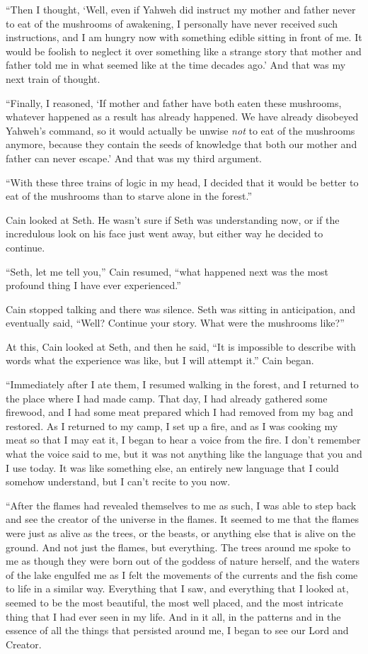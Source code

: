 \documentclass[12pt,twoside,titlepage]{report}
\begin{document}
``Then I thought, `Well, even if Yahweh did instruct my mother and
father never to eat of the mushrooms of awakening, I personally have
never received such instructions, and I am hungry now with something
edible sitting in front of me. It would be foolish to neglect it over
something like a strange story that mother and father told me in what
seemed like at the time decades ago.' And that was my next train of
thought.

``Finally, I reasoned, `If mother and father have both eaten these
mushrooms, whatever happened as a result has already happened. We have
already disobeyed Yahweh's command, so it would actually be unwise
\emph{not} to eat of the mushrooms anymore, because they contain the
seeds of knowledge that both our mother and father can never escape.'
And that was my third argument.

``With these three trains of logic in my head, I decided that it would
be better to eat of the mushrooms than to starve alone in the forest.''

Cain looked at Seth. He wasn't sure if Seth was understanding now, or if
the incredulous look on his face just went away, but either way he
decided to continue.

``Seth, let me tell you,'' Cain resumed, ``what happened next was the
most profound thing I have ever experienced.''

Cain stopped talking and there was silence. Seth was sitting in
anticipation, and eventually said, ``Well? Continue your story. What
were the mushrooms like?''

At this, Cain looked at Seth, and then he said, ``It is impossible to
describe with words what the experience was like, but I will attempt
it.'' Cain began.

``Immediately after I ate them, I resumed walking in the forest, and I
returned to the place where I had made camp. That day, I had already
gathered some firewood, and I had some meat prepared which I had removed
from my bag and restored. As I returned to my camp, I set up a fire, and
as I was cooking my meat so that I may eat it, I began to hear a voice
from the fire. I don't remember what the voice said to me, but it was
not anything like the language that you and I use today. It was like
something else, an entirely new language that I could somehow
understand, but I can't recite to you now.

``After the flames had revealed themselves to me as such, I was able to
step back and see the creator of the universe in the flames. It seemed
to me that the flames were just as alive as the trees, or the beasts, or
anything else that is alive on the ground. And not just the flames, but
everything. The trees around me spoke to me as though they were born out
of the goddess of nature herself, and the waters of the lake engulfed me
as I felt the movements of the currents and the fish come to life in a
similar way. Everything that I saw, and everything that I looked at,
seemed to be the most beautiful, the most well placed, and the most
intricate thing that I had ever seen in my life. And in it all, in the
patterns and in the essence of all the things that persisted around me,
I began to see our Lord and Creator.
\end{document}
